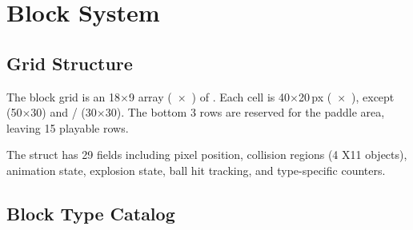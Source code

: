 \documentclass[11pt,a4paper]{article}
\begin{document}
\section{Block System}
\label{sec:blocks}

\subsection{Grid Structure}
\label{sec:block-grid}

The block grid is an 18$\times$9 array (~$\times$~) of . Each cell is 40$\times$20\,px (~$\times$~), except  (50$\times$30) and / (30$\times$30). The bottom 3 rows are reserved for the paddle area, leaving 15 playable rows.

The  struct has 29 fields including pixel position, collision regions (4 X11  objects), animation state, explosion state, ball hit tracking, and type-specific counters.

\subsection{Block Type Catalog}
\label{sec:block-types}
\end{document}
